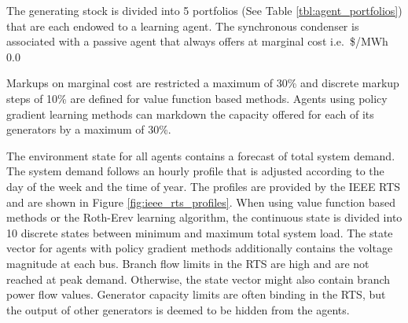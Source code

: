The generating stock is divided into 5 portfolios (See Table
\ref{tbl:agent_portfolios}) that are each endowed to a learning agent.  The
synchronous condenser is associated with a passive agent that always offers
at marginal cost i.e.~\$/MWh~$0.0$

Markups on marginal cost are restricted a maximum of 30\% and discrete markup
steps of 10\% are defined for value function based methods.  Agents using
policy gradient learning methods can markdown the capacity offered for each of
its generators by a maximum of 30\%.

The environment state for all agents contains a forecast of total system
demand.  The system demand follows an hourly profile that is adjusted according
to the day of the week and the time of year.  The profiles are provided by the
IEEE RTS and are shown in Figure \ref{fig:ieee_rts_profiles}.  When using
value function based methods or the Roth-Erev learning algorithm, the
continuous state is divided into 10 discrete states between minimum and maximum
total system load.  The state vector for agents with policy gradient methods
additionally contains the voltage magnitude at each bus.  Branch flow limits in
the RTS are high and are not reached at peak demand.  Otherwise, the state
vector might also contain branch power flow values.  Generator capacity limits
are often binding in the RTS, but the output of other generators is deemed to
be hidden from the agents.

